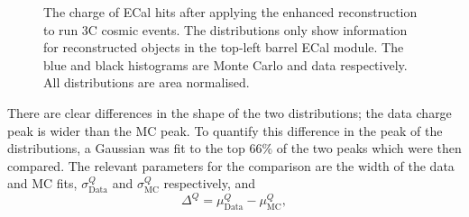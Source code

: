 \begin{figure}%
  \centering
  \hspace{1em}
  \caption{The charge of ECal hits after applying the enhanced reconstruction to run 3C cosmic events.  The distributions only show information for reconstructed objects in the top-left barrel ECal module.  The blue and black histograms are Monte Carlo and data respectively.  All distributions are area normalised.}
  \label{fig:HitChargeCosmicsTLB}
\end{figure}
There are clear differences in the shape of the two distributions; the data charge peak is wider than the MC peak.  To quantify this difference in the peak of the distributions, a Gaussian was fit to the top 66$\%$ of the two peaks which were then compared.  The relevant parameters for the comparison are the width of the data and MC fits, $\sigma_{\textrm{Data}}^{Q}$ and $\sigma_{\textrm{MC}}^{Q}$ respectively, and 
\begin{equation}
\Delta^Q = \mu_{\textrm{Data}}^Q - \mu_{\textrm{MC}}^Q,
\end{equation}
